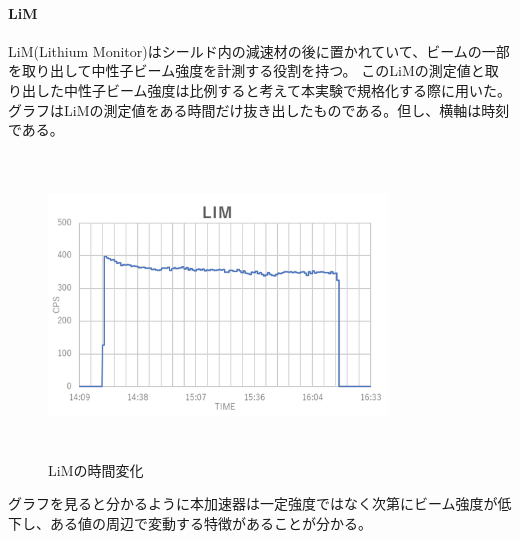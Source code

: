 \paragraph{LiM}
LiM(Lithium Monitor)はシールド内の減速材の後に置かれていて、ビームの一部を取り出して中性子ビーム強度を計測する役割を持つ。
このLiMの測定値と取り出した中性子ビーム強度は比例すると考えて本実験で規格化する際に用いた。
グラフはLiMの測定値をある時間だけ抜き出したものである。但し、横軸は時刻である。
\begin{figure}[H]
\centering
\includegraphics[width=9cm,height=8cm]{accelerator/LiM.pdf}\caption{LiMの時間変化}
\end{figure}
グラフを見ると分かるように本加速器は一定強度ではなく次第にビーム強度が低下し、ある値の周辺で変動する特徴があることが分かる。

\endgroup



